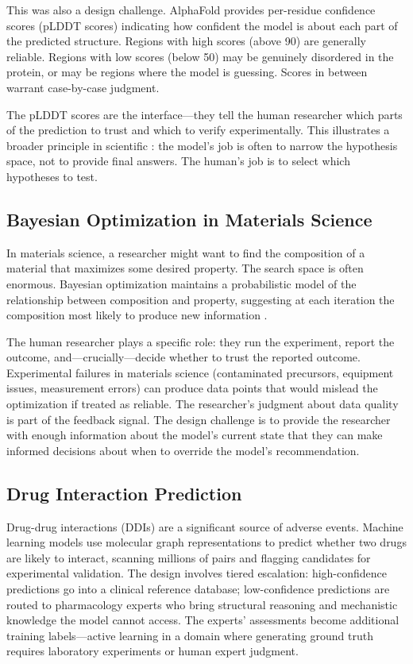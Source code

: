 This was also a \hitl design challenge. AlphaFold provides per-residue confidence scores (pLDDT scores) indicating how confident the model is about each part of the predicted structure. Regions with high scores (above 90) are generally reliable. Regions with low scores (below 50) may be genuinely disordered in the protein, or may be regions where the model is guessing. Scores in between warrant case-by-case judgment.

The pLDDT scores are the \hitl interface---they tell the human researcher which parts of the prediction to trust and which to verify experimentally. This illustrates a broader principle in scientific \hitl: the model's job is often to narrow the hypothesis space, not to provide final answers. The human's job is to select which hypotheses to test.

\subsection{Bayesian Optimization in Materials Science}

In materials science, a researcher might want to find the composition of a material that maximizes some desired property. The search space is often enormous. Bayesian optimization maintains a probabilistic model of the relationship between composition and property, suggesting at each iteration the composition most likely to produce new information \autocite{shahriari2016bayesian}.

The human researcher plays a specific role: they run the experiment, report the outcome, and---crucially---decide whether to trust the reported outcome. Experimental failures in materials science (contaminated precursors, equipment issues, measurement errors) can produce data points that would mislead the optimization if treated as reliable. The researcher's judgment about data quality is part of the feedback signal. The \hitl design challenge is to provide the researcher with enough information about the model's current state that they can make informed decisions about when to override the model's recommendation.

\subsection{Drug Interaction Prediction}

Drug-drug interactions (DDIs) are a significant source of adverse events. Machine learning models use molecular graph representations to predict whether two drugs are likely to interact, scanning millions of pairs and flagging candidates for experimental validation. The \hitl design involves tiered escalation: high-confidence predictions go into a clinical reference database; low-confidence predictions are routed to pharmacology experts who bring structural reasoning and mechanistic knowledge the model cannot access. The experts' assessments become additional training labels---active learning in a domain where generating ground truth requires laboratory experiments or human expert judgment.

